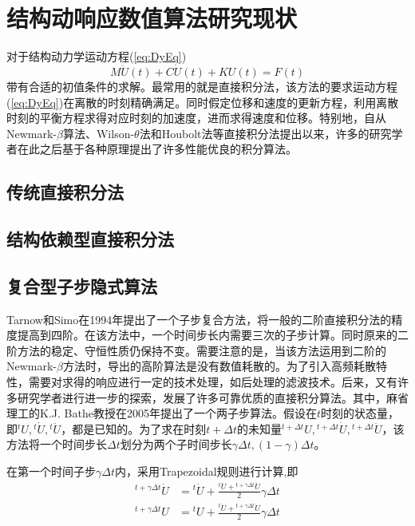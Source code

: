 \chapter{结构动响应数值算法研究现状}

对于结构动力学运动方程(\ref{eq:DyEq})
\begin{equation}
	M\ddot{U}(t)+C\dot{U}(t)+KU(t)=F(t)\label{eq:DyEq}
\end{equation}
带有合适的初值条件的求解。最常用的就是直接积分法，该方法的要求运动方程(\ref{eq:DyEq})在离散的时刻精确满足。同时假定位移和速度的更新方程，利用离散时刻的平衡方程求得对应时刻的加速度，进而求得速度和位移。特别地，自从Newmark-$\beta$算法\cite{Newmark1959}、Wilson-$\theta$法\cite{Wilson1968}和Houbolt法\cite{Chopra2011}等直接积分法提出以来，许多的研究学者在此之后基于各种原理提出了许多性能优良的积分算法。

\section{传统直接积分法}



\section{结构依赖型直接积分法}



\section{复合型子步隐式算法}
Tarnow和Simo在1994年提出了一个子步复合方法\cite{Tarnow1994}，将一般的二阶直接积分法的精度提高到四阶。在该方法中，一个时间步长内需要三次的子步计算。同时原来的二阶方法的稳定、守恒性质仍保持不变。需要注意的是，当该方法运用到二阶的Newmark-$\beta$方法\cite{Newmark1959}时，导出的高阶算法是没有数值耗散的。为了引入高频耗散特性，需要对求得的响应进行一定的技术处理，如后处理的滤波技术\cite{Fung1998}。后来，又有许多研究学者进行进一步的探索，发展了许多可靠优质的直接积分算法。其中，麻省理工的K.J. Bathe教授在2005年提出了一个两子步算法\cite{Bathe2005,Bathe2007,Bathe2012a}。假设在$t$时刻的状态量，即$^{t}\!U,{^{t}\!\dot{U}},{^{t}\!\ddot{U}}$，都是已知的。为了求在时刻$t+\Delta t$的未知量$^{t+\Delta t}\!U,{^{t+\Delta t}\!\dot{U}},{^{t+\Delta t}\!\ddot{U}}$，该方法将一个时间步长$\Delta t$划分为两个子时间步长$\gamma\Delta t,(1-\gamma)\Delta t$。

在第一个时间子步$\gamma\Delta t$内，采用Trapezoidal规则\cite{book:dover}进行计算,即
\begin{align}
{^{t+\gamma\Delta t}\!\dot{U}}&={^{t}\!\dot{U}}+\frac{{^t\!\ddot{U}}+{^{t+\gamma\Delta t}\!\ddot{U}}}{2}\gamma\Delta t\label{eq:bathev}\\
{^{t+\gamma\Delta t}\!{U}}&={^{t}\!U}+\frac{{^t\!\dot{U}}+{^{t+\gamma\Delta t}\!\dot{U}}}{2}\gamma\Delta t\label{eq:bathed}
\end{align}

